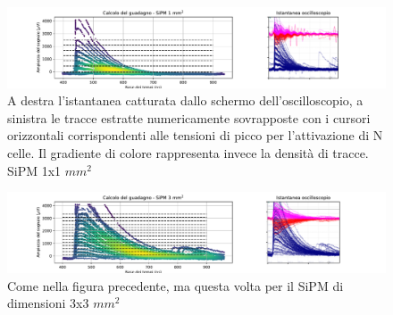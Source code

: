 \documentclass[journal]{IEEEtran}
\begin{document}
\begin{figure}[t]%
\centering
\begin{center}
\includegraphics[width=1.05\textwidth]{analysis/output/SiPM_1mm_gain_staircase.pdf}
\end{center}
\caption{A destra l'istantanea catturata dallo schermo dell'oscilloscopio, a sinistra le tracce estratte numericamente sovrapposte con i cursori orizzontali corrispondenti alle tensioni di picco per l'attivazione di N celle. Il gradiente di colore rappresenta invece la densità di tracce. SiPM 1x1 $mm^2$}
\label{fig:staircase_1mm}
\end{figure}

\begin{figure}[t]%
\centering
\begin{center}
\includegraphics[width=1.05\textwidth]{analysis/output/SiPM_3mm_gain_staircase.pdf}
\end{center}
\caption{Come nella figura precedente, ma questa volta per il SiPM di dimensioni 3x3 $mm^2$}
\label{fig:staircase_3mm}
\end{figure}
\end{document}
